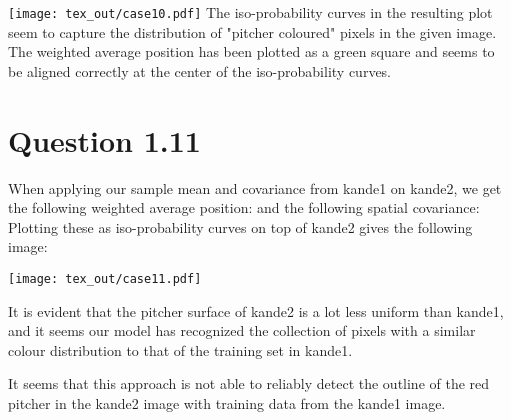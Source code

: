 \texttt{[image: tex\_out/case10.pdf]}
The iso-probability curves in the resulting plot seem to capture the distribution of "pitcher coloured" pixels in the given image. The weighted average position has been plotted as a green square and seems to be aligned correctly at the center of the iso-probability curves.

\section*{Question 1.11}
When applying our sample mean and covariance from kande1 on kande2, we get the following weighted average position:
\celevenwmean{}
and the following spatial covariance:
\celevenwcov{}
Plotting these as iso-probability curves on top of kande2 gives the following image:

\texttt{[image: tex\_out/case11.pdf]}

It is evident that the pitcher surface of kande2 is a lot less uniform than kande1, and it seems our model has recognized the collection of pixels with a similar colour distribution to that of the training set in kande1.

It seems that this approach is not able to reliably detect the outline of the red pitcher in the kande2 image with training data from the kande1 image.